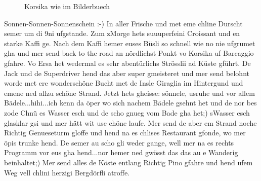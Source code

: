 \begin{figure}[b]
   \centering
   \quad
   \quad
   \quad
   \caption[Korsika wie im Birlderbuech]{Korsika wie im Bilderbuech}
\end{figure}
Sonnen-Sonnen-Sonnenschein :-) In aller Frische und met eme chline Durscht semer um di 9ni ufgstande.
Zum zMorge hets suuuperfeini Croissant und en starke Kaffi ge.
Nach dem Kaffi hemer euses Büsli so schnell wie no nie ufgrumet gha und mer send back to the road an nördlichst Ponkt vo Korsika uf Barcaggio gfahre.
Vo Ersa het wedermal es sehr abentürlichs Strösslii ad Küste gführt.
De Jack und de Superdriver hend das aber super gmeisteret und mer send belohnt worde met ere wonderschöne Bucht met de Insle Giraglia im Hintergund und emene ned allzu schöne Strand.
Jetzt hets gheisse: sönnele, usruhe und vor allem Bädele...hihi...ich kenn da öper wo sich nachem Bädele gsehnt het und de nor bes zode Chnü es Wasser esch und de scho gnueg vom Bade gha het;) sWasser esch glasklar gsi und mer hätt wit use chöne laufe.
Mer send de aber em Strand noche Richtig Genueseturm gloffe und hend na es chlises Restaurant gfonde, wo mer öpis trunke hend.
De semer au scho gli weder gange, well mer na es rechts Programm vor eus gha hend...nor hemer ned gwösst das das au e Wanderig beinhaltet;) Mer send alles de Köste entlang Richtig Pino gfahre und hend ufem Weg vell chlini herzigi Bergdörfli atroffe.
